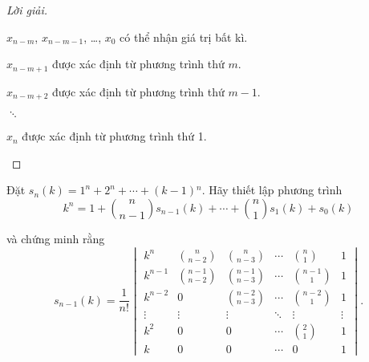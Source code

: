 \documentclass[class=nhvh-linear-algebra,crop=false]{standalone}
\begin{document}
\begin{proof}[Lời giải]
\begin{enumerate}[label = \textbf{Trường hợp \arabic*.},itemindent=2cm]
		      \par $x_{n-m}$, $x_{n-m-1}$, \ldots, $x_{0}$ có thể nhận giá trị bất kì.
		      \par $x_{n-m+1}$ được xác định từ phương trình thứ $m$.
		      \par $x_{n-m+2}$ được xác định từ phương trình thứ $m-1$.
		      \par $\ddots$
		      \par $x_{n}$ được xác định từ phương trình thứ 1.
	\end{enumerate}
\end{proof}

\begin{exercise}
	\par Đặt $s_{n}(k) = 1^{n} + 2^{n} + \cdots + (k-1){}^{n}$. Hãy thiết lập phương trình
	\[
		k^{n} = 1 + \binom{n}{n-1}s_{n-1}(k) + \cdots + \binom{n}{1}s_{1}(k) + s_{0}(k)
	\]
	\par và chứng minh rằng
	\[
		s_{n-1}(k) = \frac{1}{n!}
		\begin{vmatrix}
			k^{n}   & \binom{n}{n-2}   & \binom{n}{n-3}   & \cdots & \binom{n}{1}   & 1      \\
			k^{n-1} & \binom{n-1}{n-2} & \binom{n-1}{n-3} & \cdots & \binom{n-1}{1} & 1      \\
			k^{n-2} & 0                & \binom{n-2}{n-3} & \cdots & \binom{n-2}{1} & 1      \\
			\vdots  & \vdots           & \vdots           & \ddots & \vdots         & \vdots \\
			k^{2}   & 0                & 0                & \cdots & \binom{2}{1}   & 1      \\
			k       & 0                & 0                & \cdots & 0              & 1
		\end{vmatrix}.
	\]
\end{exercise}
\end{document}
